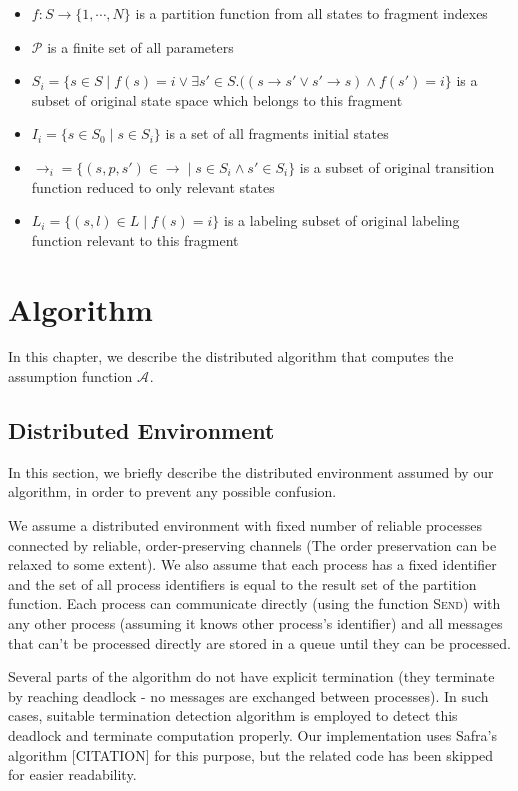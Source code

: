 \documentclass[12pt,oneside,draft]{fithesis2}
\newcommand{\as}[1][]{\ensuremath{\mathcal{A}_{#1}}}
\newcommand{\method}[1]{\textnormal{\textsc{#1}}}
\newcommand{\trans}[1]{\stackrel{#1}{\rightarrow}}
\newcommand{\params}{\mathcal{P}}
\begin{document}
			\begin{itemize}
				\item $f : S \rightarrow \{1, \cdots , N \}$ is a partition function from all states to fragment indexes
				\item $\params$ is a finite set of all parameters
				\item $S_{i} = \{ s \in S \mid f(s) = i \vee \exists s'\in S. ((s \trans{} s' \vee s' \trans{} s) \wedge f(s') = i \}$ is a subset of original state space which belongs to this fragment
				\item $I_{i} = \{ s \in S_0 \mid s \in S_{i} \} $ is a set of all fragments initial states
				\item $\trans{}_{i} = \{ (s, p, s') \in \trans{} \mid s \in S_{i} \wedge s' \in S_{i} \}$ is a subset of original transition function reduced to only relevant states
				\item $L_{i} = \{ (s, l) \in L \mid f(s) = i \}$ is a labeling subset of original labeling function relevant to this fragment
			\end{itemize}
						
		
    \chapter{Algorithm}
    
    	In this chapter, we describe the distributed algorithm that computes the assumption function $\as$. 
    	
    	\section{Distributed Environment}
    	
		In this section, we briefly describe the distributed environment assumed by our algorithm, in order to prevent any possible confusion.
		
		We assume a distributed environment with fixed number of reliable processes connected by reliable, order-preserving channels (The order preservation can be relaxed to some extent). We also assume that each process has a fixed identifier and the set of all process identifiers is equal to the result set of the partition function. Each process can communicate directly (using the function \method{Send}) with any other process (assuming it knows other process's identifier) and all messages that can't be processed directly are stored in a queue until they can be processed.
		
		Several parts of the algorithm do not have explicit termination (they terminate by reaching deadlock - no messages are exchanged between processes). In such cases, suitable termination detection algorithm is employed to detect this deadlock and terminate computation properly. Our implementation uses Safra's algorithm [CITATION] for this purpose, but the related code has been skipped for easier readability.
    	
\end{document}
